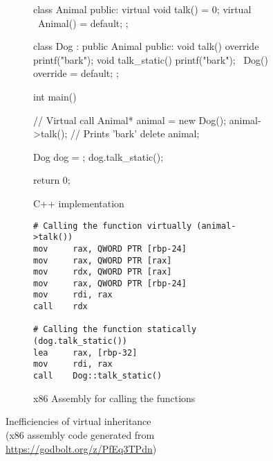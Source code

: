 \begin{figure}[p]
    \centering
    \begin{subfigure}{0.49\linewidth}%
        \begin{cppcode}
class Animal {
public:
    virtual void talk() = 0;
    virtual ~Animal() = default;
};

class Dog : public Animal {
public:
    void talk() override {
        printf("bark\n");
    }
    void talk_static() {
        printf("bark\n");
    }
    ~Dog() override = default;
};

int main() {
    // Virtual call
    Animal* animal = new Dog();
    animal->talk(); // Prints 'bark'
    delete animal;

    Dog dog = {};
    dog.talk_static();

    return 0;
}
        \end{cppcode}
        \caption{C++ implementation}
    \end{subfigure}
    \begin{subfigure}{0.49\linewidth}%
        \begin{verbatim}
# Calling the function virtually (animal->talk())
mov     rax, QWORD PTR [rbp-24]
mov     rax, QWORD PTR [rax]
mov     rdx, QWORD PTR [rax]
mov     rax, QWORD PTR [rbp-24]
mov     rdi, rax
call    rdx
        
# Calling the function statically (dog.talk_static())
lea     rax, [rbp-32]
mov     rdi, rax
call    Dog::talk_static()
        \end{verbatim}
        \caption{x86 Assembly for calling the functions}
    \end{subfigure}%
    \caption{Inefficiencies of virtual inheritance\\(x86 assembly code generated from \url{https://godbolt.org/z/PfEq3TPdn})}
    \label{fig:virtual_inheritance}
\end{figure}